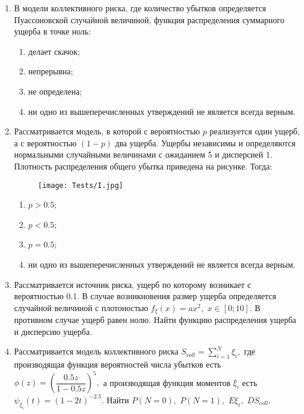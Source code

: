 \documentclass[12pt]{article}
\begin{document}
\begin{enumerate}
\setlength\itemsep{-0.15em}

\item В модели коллективного риска, где количество убытков определяется Пуассоновской случайной величиной, функция распределения суммарного ущерба в точке ноль:
\begin{enumerate}
\setlength\itemsep{-0.15em}
    \item делает скачок;
    \item непрерывна;
    \item не определена;
    \item ни одно из вышеперечисленных утверждений не является всегда верным.
\end{enumerate}

\item Рассматривается модель, в которой с вероятностью $p$ реализуется один ущерб, а с вероятностью $(1-p)$ два ущерба. Ущербы независимы и определяются нормальными случайными величинами с ожиданием 5 и дисперсией 1. Плотность распределения общего убытка приведена на рисунке. Тогда:

\begin{figure}[!h]
    \begin{center}
    \texttt{[image: Tests/I.jpg]}
    \end{center}
\end{figure}


\begin{enumerate}
\setlength\itemsep{-0.15em}
    \item $p>0.5$;
    \item $p<0.5$;
    \item $p=0.5$;
    \item ни одно из вышеперечисленных утверждений не является всегда верным.
\end{enumerate}

\item Рассматривается источник риска, ущерб по которому возникает с вероятностью 0.1. В случае возникновения размер ущерба определяется случайной величиной с плотоностью $f_\xi(x)=ax^2,$ $x\in[0;10].$ В противном случае ущерб равен нолю. Найти функцию распределения ущерба и дисперсию ущерба.

\item Рассматривается модель коллективного риска $S_{coll}=\sum\limits_{i=1}^N\xi_i,$ где производящая функция вероятностей числа убытков есть $\phi(z)=\left(\dfrac{0.5z}{1-0.5z}\right)^5,$ а производящая функция моментов $\xi_i$ есть $\psi_{\xi_i}(t)=(1-2t)^{-2.5}.$ Найти $P(N=0),$ $P(N=1),$ $E\xi_i,$ $DS_{coll}.$


\end{enumerate}
\end{document}
